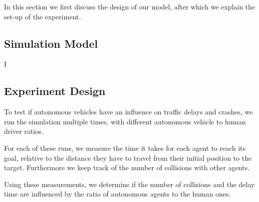 In this section we first discuss the design of our model, after which we explain the set-up of the experiment.

\subsection{Simulation Model}
\label{sub:method:model}


I
\subsection{Experiment Design}
\label{sub:method:design}
To test if autonomous vehicles have an influence on traffic delays and crashes, we run the simulation multiple times, with different autonomous vehicle to human driver ratios.

For each of these runs, we measure the time it takes for each agent to reach its goal, relative to the distance they have to travel from their initial position to the target. Furthermore we keep track of the number of collisions with other agents. 

Using these measurements, we  determine if the number of collisions and the delay time are influenced by the ratio of autonomous agents to the human ones. 
